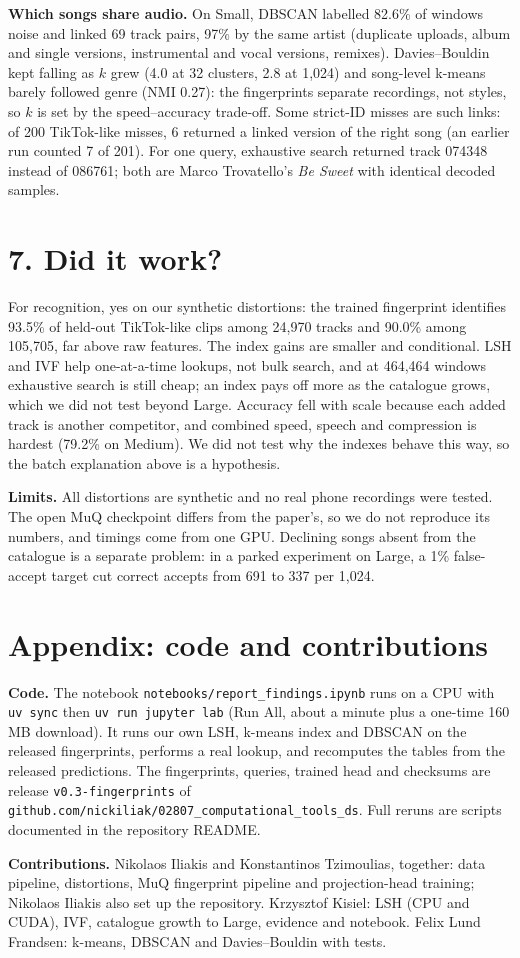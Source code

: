 \documentclass[11pt,a4paper]{article}
\begin{document}
\textbf{Which songs share audio.} On Small, DBSCAN labelled 82.6\% of windows noise and linked 69 track pairs, 97\% by the same artist (duplicate uploads, album and single versions, instrumental and vocal versions, remixes). Davies--Bouldin kept falling as $k$ grew (4.0 at 32 clusters, 2.8 at 1,024) and song-level k-means barely followed genre (NMI 0.27): the fingerprints separate recordings, not styles, so $k$ is set by the speed--accuracy trade-off. Some strict-ID misses are such links: of 200 TikTok-like misses, 6 returned a linked version of the right song (an earlier run counted 7 of 201). For one query, exhaustive search returned track 074348 instead of 086761; both are Marco Trovatello's \emph{Be Sweet} with identical decoded samples.

\section*{7. Did it work?}
For recognition, yes on our synthetic distortions: the trained fingerprint identifies 93.5\% of held-out TikTok-like clips among 24,970 tracks and 90.0\% among 105,705, far above raw features. The index gains are smaller and conditional. LSH and IVF help one-at-a-time lookups, not bulk search, and at 464,464 windows exhaustive search is still cheap; an index pays off more as the catalogue grows, which we did not test beyond Large. Accuracy fell with scale because each added track is another competitor, and combined speed, speech and compression is hardest (79.2\% on Medium). We did not test why the indexes behave this way, so the batch explanation above is a hypothesis.

\textbf{Limits.} All distortions are synthetic and no real phone recordings were tested. The open MuQ checkpoint differs from the paper's, so we do not reproduce its numbers, and timings come from one GPU. Declining songs absent from the catalogue is a separate problem: in a parked experiment on Large, a 1\% false-accept target cut correct accepts from 691 to 337 per 1,024.

\section*{Appendix: code and contributions}
\textbf{Code.} The notebook \texttt{notebooks/report\_findings.ipynb} runs on a CPU with \texttt{uv sync} then \texttt{uv run jupyter lab} (Run All, about a minute plus a one-time 160 MB download). It runs our own LSH, k-means index and DBSCAN on the released fingerprints, performs a real lookup, and recomputes the tables from the released predictions. The fingerprints, queries, trained head and checksums are release \texttt{v0.3-fingerprints} of \texttt{github.com/nickiliak/02807\_computational\_tools\_ds}. Full reruns are scripts documented in the repository README.

\textbf{Contributions.} Nikolaos Iliakis and Konstantinos Tzimoulias, together: data pipeline, distortions, MuQ fingerprint pipeline and projection-head training; Nikolaos Iliakis also set up the repository. Krzysztof Kisiel: LSH (CPU and CUDA), IVF, catalogue growth to Large, evidence and notebook. Felix Lund Frandsen: k-means, DBSCAN and Davies--Bouldin with tests.
\end{document}
